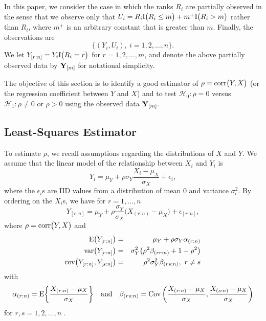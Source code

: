 \documentclass[12pt]{article}
\begin{document}
In this paper,
 we consider the case in which the ranks $R_i$ are partially observed 
in the sense that we observe only that
$U_{i}=R_i {\rm I}\big(R_{i} \le m \big) + m^{+} {\rm I} \big( R_{i}>m \big)$
rather than $R_i$, where $m^+$ is an arbitrary constant that is greater than $m$. Finally, 
the observations are 
\begin{equation} \nonumber
\big\{ (Y_i, U_i), ~i=1,2,\ldots,n \big\}.
\end{equation}
We let $Y_{[r:n]}=Y_{i} {\rm I} \big(R_{i}=r\big)$ 
for $r=1,2,\ldots,m$, and denote the above partially observed data by 
${\bf Y}_{[m]}$ for notational simplicity. 


The objective of this section is to identify a good estimator of $\rho={\rm corr} \big(Y, X\big)$ (or
the regression coefficient between $Y$ and $X$) and to test $\mathcal{H}_0: \rho=0$ versus $\mathcal{H}_1: \rho\neq 0$ or $\rho >0$ using the observed data ${\bf Y}_{[m]}$. 



\subsection{Least-Squares Estimator}

To estimate $\rho$, we recall assumptions regarding the distributions of $X$ and $Y$. 
We assume that the linear model of the relationship between $X_i$ and $Y_i$ is 
\begin{equation}  \nonumber
Y_i = \mu_Y + \rho \sigma_Y \frac{X_i - \mu_X}{\sigma_X} + \epsilon_i,
\end{equation}
where the $\epsilon_i$s are IID values from a distribution of mean $0$ and variance $\sigma_{\epsilon}^2$. 
By ordering on the $X_i$s, we have for $r=1,\ldots,n$
\begin{equation}
Y_{[r:n]} = \mu_Y + \rho \frac{\sigma_Y}{\sigma_X} \big( X_{(r:n)} -\mu_X \big) + \epsilon_{[r:n]}, \label{eqn:con-linear}
\end{equation}
where $\rho = {\rm corr} \big( Y, X \big)$ and 
\begin{eqnarray}
{\rm E} \big(Y_{[r:n]} \big) &=& \mu_Y + \rho \sigma_Y \alpha_{(r:n)}  \label{eqn:con-mean}\\
{\rm var} \big( Y_{[r:n]} \big) &=& \sigma_Y^2 \big( \rho^2 \beta_{(rr:n)} + 1 - \rho^2 \big) \nonumber \\
{\rm cov} \big(Y_{[r:n]},Y_{[s:n]}\big) &=& \rho^2\sigma_Y^2\beta_{(rs:n)},~r \ne s \nonumber
\end{eqnarray}
with 
\begin{equation}  \nonumber
\alpha_{(r:n)} = {\rm E} \bigg\{ \frac{ X_{(r:n)} - \mu_X } { \sigma_X} \bigg\} \quad \mbox{and } ~~
\beta_{(rs:n)} = {\rm Cov} \left(   \frac{ X_{(r:n)} - \mu_X } { \sigma_X},
\frac{ X_{(s:n)} - \mu_X } { \sigma_X} \right)
\end{equation}
for $r,s=1,2,\ldots,n$ \citep{David:1974,David:2003}.
\end{document}
